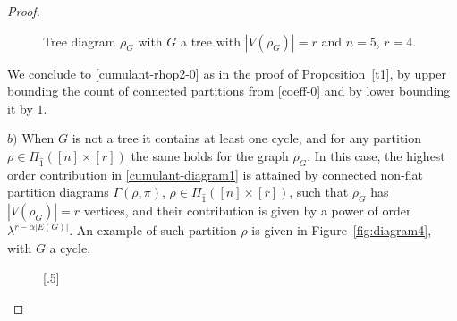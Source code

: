 \documentclass[bj,authoryear,noshowframe]{imsart}
\theoremstyle{plain}
\theoremstyle{remark}
\begin{document}
\begin{proof}
\begin{figure}[H]
{}%
\caption{Tree diagram $\rho_G$ with $G$ a tree with $|V(\rho_G)|=r$ and $n=5$, $r=4$.}
\label{fig:diagram4-0}
\end{figure}

\vskip-0.3cm

\noindent
 We conclude to \eqref{cumulant-rhop2-0} 
 as in the proof of Proposition~\ref{t1}, 
 by upper bounding the count of connected partitions from \eqref{coeff-0}
 and by lower bounding it by $1$. 

 \noindent
   $b)$ 
   When $G$ is not a tree it contains at least one cycle, and
   for any partition $\rho\in\Pi_{\widehat{1}} ([n]\times[r])$  
   the same holds for the graph $\rho_G$. 
In this case, the highest order contribution in
\eqref{cumulant-diagram1} is attained by connected non-flat partition diagrams 
$\Gamma ( \rho , \pi )$, $\rho\in\Pi_{\widehat{1}} ([n]\times[r])$,
such that $\rho_G$ has $|V(\rho_G)| = r$ vertices, 
and their contribution is given by a power of order $\lambda^{r-\alpha |E(G)|}$. 
 An example of such partition $\rho$ is given in Figure~\ref{fig:diagram4}, 
 with $G$ a cycle. 

\smallskip

\begin{figure}[H]
\captionsetup[subfigure]{font=footnotesize}
\centering
{}[.5\textwidth]{%
}
\end{figure}
\end{proof}
\end{document}
